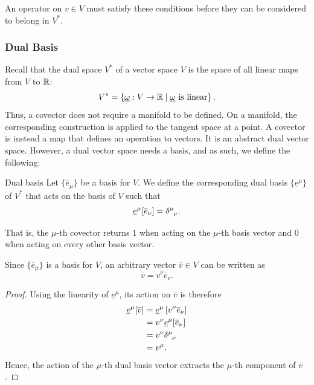		An operator on $v\in V$ must satisfy these conditions before they 
		can be considered to belong in $V^*$.

	\subsubsection{Dual Basis}

		Recall that the dual space $V^*$ of a vector space $V$ is the space of all
		linear maps from $V$ to $\mathbb{R}$:
		\[
			V^*
			=
			\left\{
				\underline{\omega}:V\to\mathbb{R}
				\;\middle|\;
				\underline{\omega}\text{ is linear}
			\right\}.
		\]
		Thus, a covector does not require a manifold to be defined. On a manifold,
		the corresponding construction is applied to the tangent space at a point.
		A covector is instead a map that defines an operation to vectors. It is an 
		abstract dual vector space. However, a dual vector space needs a basis, and as such,
		we define the following:

		\begin{definition}{Dual basis}
			Let $\{\overline{e}_\mu\}$ be a basis for $V$. We define the corresponding
			dual basis $\{\underline{e}^\mu\}$ of $V^*$ that acts on the basis of $V$
			such that
			\begin{equation}
				\label{eq:dual-basis-definition}
				\underline{e}^\mu[\overline{e}_\nu]
				=
				\tensor{\delta}{^\mu_\nu}.
			\end{equation}
		\end{definition}

		That is, the $\mu$-th covector returns $1$ when acting on the $\mu$-th
		basis vector and $0$ when acting on every other basis vector.

		Since $\{\overline{e}_\mu\}$ is a basis for $V$, an arbitrary vector
		$\overline{v}\in V$ can be written as
		\[
			\overline{v}
			=
			v^\nu\overline{e}_\nu.
		\]
		\begin{proof}
			Using the linearity of $\underline{e}^\mu$, its action on $\overline{v}$
			is therefore
			\begin{align}
				\underline{e}^\mu[\overline{v}]
				&=
				\underline{e}^\mu
				\left[
					v^\nu\overline{e}_\nu
				\right]
				\nonumber\\
				&=
				v^\nu
				\underline{e}^\mu[\overline{e}_\nu]
				\nonumber\\
				&=
				v^\nu
				\tensor{\delta}{^\mu_\nu}
				\nonumber\\
				&=
				v^\mu.
				\label{eq:dual-action}
			\end{align}
			Hence, the action of the $\mu$-th dual basis vector extracts the $\mu$-th
			component of $\overline{v}$.
		\end{proof}

